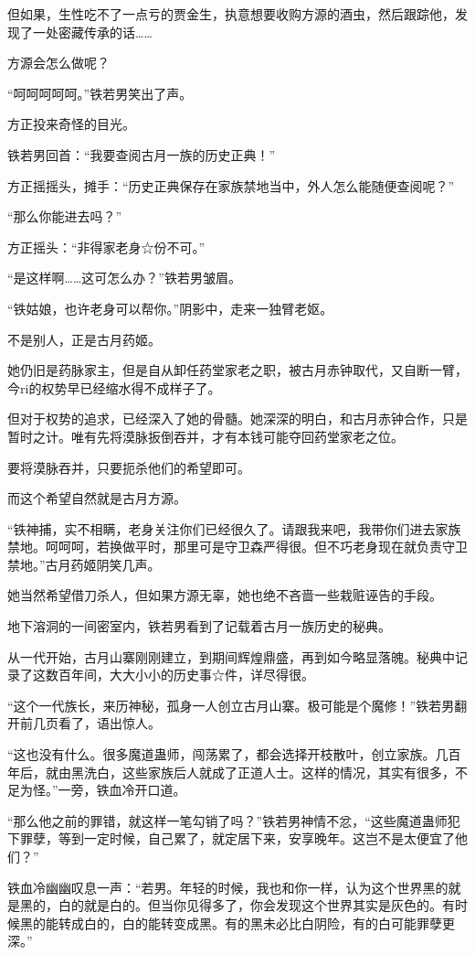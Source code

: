 \begin{this_body}
但如果，生性吃不了一点亏的贾金生，执意想要收购方源的酒虫，然后跟踪他，发现了一处密藏传承的话……

方源会怎么做呢？

“呵呵呵呵呵。”铁若男笑出了声。

方正投来奇怪的目光。

铁若男回首：“我要查阅古月一族的历史正典！”

方正摇摇头，摊手：“历史正典保存在家族禁地当中，外人怎么能随便查阅呢？”

“那么你能进去吗？”

方正摇头：“非得家老身☆份不可。”

“是这样啊……这可怎么办？”铁若男皱眉。

“铁姑娘，也许老身可以帮你。”阴影中，走来一独臂老妪。

不是别人，正是古月药姬。

她仍旧是药脉家主，但是自从卸任药堂家老之职，被古月赤钟取代，又自断一臂，今ri的权势早已经缩水得不成样子了。

但对于权势的追求，已经深入了她的骨髓。她深深的明白，和古月赤钟合作，只是暂时之计。唯有先将漠脉扳倒吞并，才有本钱可能夺回药堂家老之位。

要将漠脉吞并，只要扼杀他们的希望即可。

而这个希望自然就是古月方源。

“铁神捕，实不相瞒，老身关注你们已经很久了。请跟我来吧，我带你们进去家族禁地。呵呵呵，若换做平时，那里可是守卫森严得很。但不巧老身现在就负责守卫禁地。”古月药姬阴笑几声。

她当然希望借刀杀人，但如果方源无辜，她也绝不吝啬一些栽赃诬告的手段。

地下溶洞的一间密室内，铁若男看到了记载着古月一族历史的秘典。

从一代开始，古月山寨刚刚建立，到期间辉煌鼎盛，再到如今略显落魄。秘典中记录了这数百年间，大大小小的历史事☆件，详尽得很。

“这个一代族长，来历神秘，孤身一人创立古月山寨。极可能是个魔修！”铁若男翻开前几页看了，语出惊人。

“这也没有什么。很多魔道蛊师，闯荡累了，都会选择开枝散叶，创立家族。几百年后，就由黑洗白，这些家族后人就成了正道人士。这样的情况，其实有很多，不足为怪。”一旁，铁血冷开口道。

“那么他之前的罪错，就这样一笔勾销了吗？”铁若男神情不忿，“这些魔道蛊师犯下罪孽，等到一定时候，自己累了，就定居下来，安享晚年。这岂不是太便宜了他们？”

铁血冷幽幽叹息一声：“若男。年轻的时候，我也和你一样，认为这个世界黑的就是黑的，白的就是白的。但当你见得多了，你会发现这个世界其实是灰色的。有时候黑的能转成白的，白的能转变成黑。有的黑未必比白阴险，有的白可能罪孽更深。”


\end{this_body}
